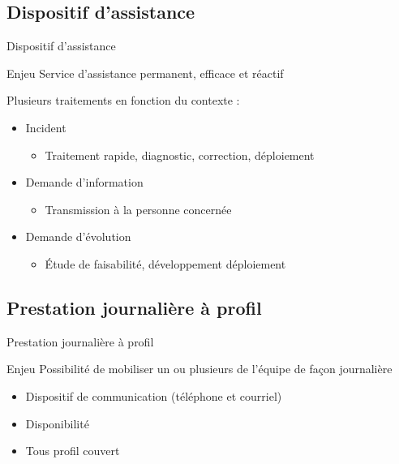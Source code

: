 \subsection{Dispositif d'assistance}
\begin{frame}{Dispositif d'assistance}
	\begin{block}{Enjeu}
	Service d'assistance permanent, efficace et réactif
	\end{block}
	\pause
	\vfill
	Plusieurs traitements en fonction du contexte : 
	\begin{itemize}
		\item Incident
			\begin{itemize}
				\item Traitement rapide, diagnostic, correction, déploiement
			\end{itemize}
		\item Demande d'information
			\begin{itemize}
				\item Transmission à la personne concernée
			\end{itemize}
		\item Demande d'évolution
		\begin{itemize}
			\item Étude de faisabilité, développement déploiement
		\end{itemize}
	\end{itemize}
\end{frame}
\DylanSpeak
\subsection{Prestation journalière à profil}
\begin{frame}{Prestation journalière à profil}
		\begin{block}{Enjeu}
			Possibilité de mobiliser un ou plusieurs de l'équipe de façon journalière
		\end{block}
		\begin{itemize}
			\item Dispositif de communication (téléphone et courriel)
			\item Disponibilité 
			\item Tous profil couvert
		\end{itemize}
\end{frame}
\DylanSpeak
